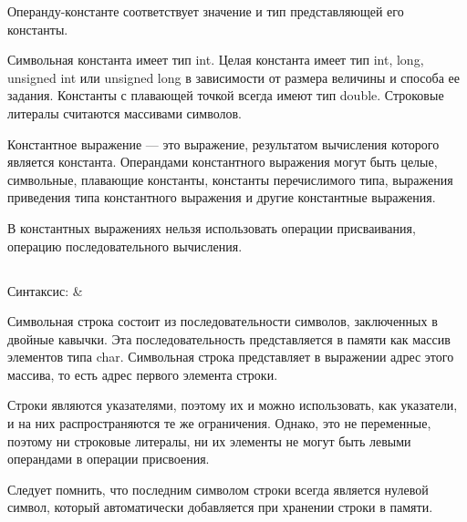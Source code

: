 Операнду-константе соответствует значение и тип представляющей его константы. 

Символьная константа имеет тип int. Целая константа имеет тип int, long, unsigned int или unsigned long в зависимости от размера величины и способа ее задания. Константы с плавающей точкой всегда имеют тип double. Строковые литералы считаются массивами символов. \killoverfullbefore 


Константное выражение — это выражение, результатом вычисления которого является константа. Операндами константного выражения могут быть целые, символьные, плавающие константы, константы перечислимого типа, выражения приведения типа константного выражения и другие константные выражения. \killoverfullbefore

В константных выражениях нельзя использовать операции присваивания, операцию последовательного вычисления. \killoverfullbefore

\subsection{}

\begin{pHeader}
Синтаксис:      & \\
\end{pHeader}

Символьная строка состоит из последовательности символов, заключенных в двойные кавычки. Эта последовательность представляется в памяти как массив элементов типа char. Символьная строка представляет в выражении адрес этого массива, то есть адрес первого элемента строки. \killoverfullbefore 

Строки являются указателями, поэтому их и можно использовать, как указатели, и на них распространяются те же ограничения. Однако, это не переменные, поэтому ни строковые литералы, ни их элементы не могут быть левыми операндами в операции присвоения. \killoverfullbefore 

Следует помнить, что последним символом строки всегда является нулевой символ, который автоматически добавляется при хранении строки в памяти. \killoverfullbefore 

